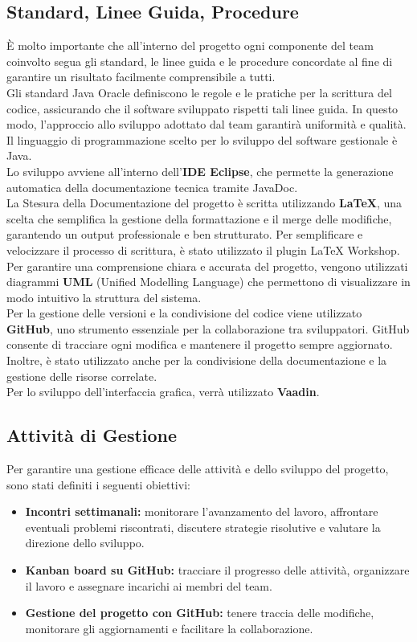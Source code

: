 \documentclass[a4paper,12pt]{article}
\begin{document}
\subsection{Standard, Linee Guida, Procedure} %
È molto importante che all’interno del progetto ogni componente del team coinvolto segua gli standard, le linee guida e le procedure concordate al fine di garantire un risultato facilmente comprensibile a tutti. \\
Gli standard Java Oracle definiscono le regole e le pratiche per la scrittura del codice, assicurando che il software sviluppato rispetti tali linee guida. In questo modo, l'approccio allo sviluppo adottato dal team garantirà uniformità e qualità.\\
Il linguaggio di programmazione scelto per lo sviluppo del software gestionale è Java.\\
Lo sviluppo avviene all'interno dell'\textbf{IDE Eclipse}, che permette la generazione automatica della documentazione tecnica tramite JavaDoc.\\
La Stesura della Documentazione del progetto è scritta utilizzando \textbf{LaTeX}, una scelta che semplifica la gestione della formattazione e il merge delle modifiche, garantendo un output professionale e ben strutturato. Per semplificare e velocizzare il processo di scrittura, è stato utilizzato il plugin LaTeX Workshop.\\
Per garantire una comprensione chiara e accurata del progetto, vengono utilizzati diagrammi \textbf{UML} (Unified Modelling Language) che permettono di visualizzare in modo intuitivo la struttura del sistema.\\
Per la gestione delle versioni e la condivisione del codice viene utilizzato \textbf{GitHub}, uno strumento essenziale per la collaborazione tra sviluppatori. GitHub consente di tracciare ogni modifica e mantenere il progetto sempre aggiornato. Inoltre, è stato utilizzato anche per la condivisione della documentazione e la gestione delle risorse correlate.\\
Per lo sviluppo dell'interfaccia grafica, verrà utilizzato \textbf{Vaadin}.

\subsection{Attività di Gestione} %
Per garantire una gestione efficace delle attività e dello sviluppo del progetto, sono stati definiti i seguenti obiettivi:
\begin{itemize}
    \item \textbf{Incontri settimanali:} monitorare l’avanzamento del lavoro, affrontare eventuali problemi riscontrati, discutere strategie risolutive e valutare la direzione dello sviluppo.
    \item \textbf{Kanban board su GitHub:} tracciare il progresso delle attività, organizzare il lavoro e assegnare incarichi ai membri del team.
    \item \textbf{Gestione del progetto con GitHub:} tenere traccia delle modifiche, monitorare gli aggiornamenti e facilitare la collaborazione.
\end{itemize}
\end{document}
